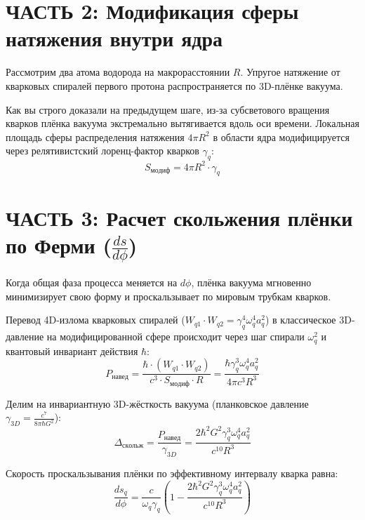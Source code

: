 \documentclass[12pt,a4paper]{article}
\begin{document}
\section*{ЧАСТЬ 2: Модификация сферы натяжения внутри ядра}

Рассмотрим два атома водорода на макрорасстоянии $R$. Упругое натяжение от кварковых спиралей первого протона распространяется по 3D-плёнке вакуума.

Как вы строго доказали на предыдущем шаге, из-за субсветового вращения кварков плёнка вакуума экстремально вытягивается вдоль оси времени. Локальная площадь сферы распределения натяжения $4\pi R^2$ в области ядра модифицируется через релятивистский лоренц-фактор кварков $\gamma_q$:
\begin{equation}
S_{модиф} = 4\pi R^2 \cdot \gamma_q
\end{equation}

\section*{ЧАСТЬ 3: Расчет скольжения плёнки по Ферми ($\frac{ds}{d\phi}$)}

Когда общая фаза процесса меняется на $d\phi$, плёнка вакуума мгновенно минимизирует свою форму и проскальзывает по мировым трубкам кварков.

Перевод 4D-излома кварковых спиралей ($W_{q1} \cdot W_{q2} = \gamma_q^4 \omega_q^4 a_q^2$) в классическое 3D-давление на модифицированной сфере происходит через шаг спирали $\omega_q^2$ и квантовый инвариант действия $\hbar$:
\begin{equation}
P_{навед} = \frac{\hbar \cdot (W_{q1} \cdot W_{q2})}{c^3 \cdot S_{модиф} \cdot R} = \frac{\hbar \gamma_q^3 \omega_q^4 a_q^2}{4\pi c^3 R^3}
\end{equation}

Делим на инвариантную 3D-жёсткость вакуума (планковское давление $\gamma_{3D} = \frac{c^7}{8\pi \hbar G^2}$):
\begin{equation}
\Delta_{скольж} = \frac{P_{навед}}{\gamma_{3D}} = \frac{2 \hbar^2 G^2 \gamma_q^3 \omega_q^4 a_q^2}{c^{10} R^3}
\end{equation}

Скорость проскальзывания плёнки по эффективному интервалу кварка равна:
\begin{equation}
\frac{ds_q}{d\phi} = \frac{c}{\omega_q \gamma_q} \left( 1 - \frac{2 \hbar^2 G^2 \gamma_q^3 \omega_q^4 a_q^2}{c^{10} R^3} \right)
\end{equation}
\end{document}
